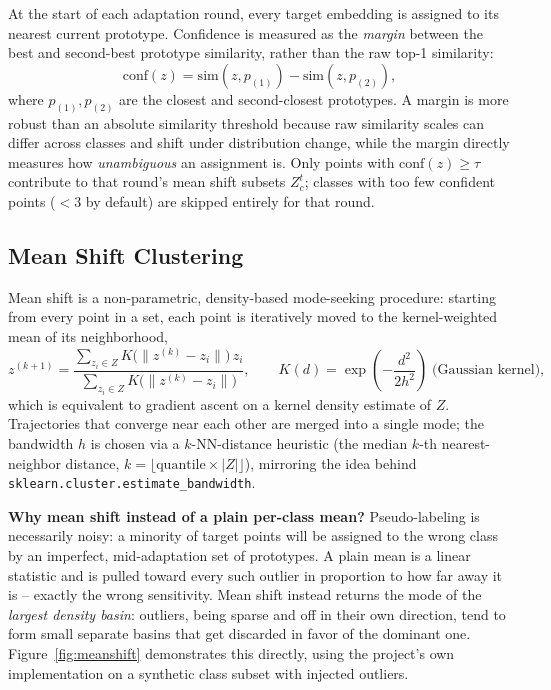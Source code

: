 \documentclass[11pt]{article}
\begin{document}
At the start of each adaptation round, every target embedding is assigned to its nearest current
prototype. Confidence is measured as the \emph{margin} between the best and second-best
prototype similarity, rather than the raw top-1 similarity:
\begin{equation}
\mathrm{conf}(z) = \mathrm{sim}(z, p_{(1)}) - \mathrm{sim}(z, p_{(2)}),
\end{equation}
where $p_{(1)}, p_{(2)}$ are the closest and second-closest prototypes. A margin is more robust
than an absolute similarity threshold because raw similarity scales can differ across classes
and shift under distribution change, while the margin directly measures how \emph{unambiguous}
an assignment is. Only points with $\mathrm{conf}(z) \geq \tau$ contribute to that round's mean
shift subsets $Z_c^t$; classes with too few confident points ($< 3$ by default) are skipped
entirely for that round.

\subsection{Mean Shift Clustering}
\label{sec:meanshift}

Mean shift \cite{comaniciu2002meanshift} is a non-parametric, density-based mode-seeking
procedure: starting from every point in a set, each point is iteratively moved to the
kernel-weighted mean of its neighborhood,
\begin{equation}
z^{(k+1)} = \frac{\sum_{z_i \in Z} K\big(\lVert z^{(k)} - z_i \rVert\big)\, z_i}
                  {\sum_{z_i \in Z} K\big(\lVert z^{(k)} - z_i \rVert\big)},
\qquad K(d) = \exp\!\left(-\frac{d^2}{2h^2}\right) \; \text{(Gaussian kernel)},
\end{equation}
which is equivalent to gradient ascent on a kernel density estimate of $Z$. Trajectories that
converge near each other are merged into a single mode; the bandwidth $h$ is chosen via a
$k$-NN-distance heuristic (the median $k$-th nearest-neighbor distance, $k = \lfloor
\mathrm{quantile} \times |Z| \rfloor$), mirroring the idea behind
\texttt{sklearn.cluster.estimate\_bandwidth}.

\textbf{Why mean shift instead of a plain per-class mean?} Pseudo-labeling is necessarily noisy:
a minority of target points will be assigned to the wrong class by an imperfect, mid-adaptation
set of prototypes. A plain mean is a linear statistic and is pulled toward every such outlier in
proportion to how far away it is -- exactly the wrong sensitivity. Mean shift instead returns
the mode of the \emph{largest density basin}: outliers, being sparse and off in their own
direction, tend to form small separate basins that get discarded in favor of the dominant one.
Figure~\ref{fig:meanshift} demonstrates this directly, using the project's own implementation on
a synthetic class subset with injected outliers.
\end{document}
